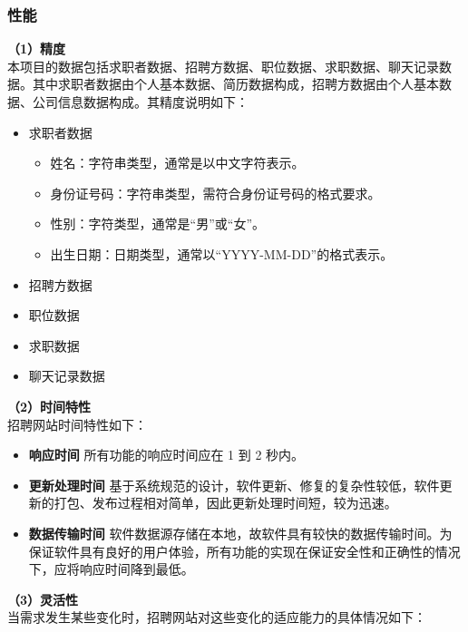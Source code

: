 \documentclass[UTF8,a4paper,10pt]{ctexart}
\begin{document}
\subsubsection{性能}

\textbf{（1）精度}\\
本项目的数据包括求职者数据、招聘方数据、职位数据、求职数据、聊天记录数据。其中求职者数据由个人基本数据、简历数据构成，招聘方数据由个人基本数据、公司信息数据构成。其精度说明如下：

\begin{itemize}
    \item 求职者数据
        \begin{itemize}
            \item 姓名：字符串类型，通常是以中文字符表示。
            \item 身份证号码：字符串类型，需符合身份证号码的格式要求。
            \item 性别：字符类型，通常是“男”或“女”。
            \item 出生日期：日期类型，通常以“YYYY-MM-DD”的格式表示。
        \end{itemize}
    \item 招聘方数据
    \item 职位数据
    \item 求职数据
    \item 聊天记录数据
\end{itemize}

\textbf{（2）时间特性}\\
招聘网站时间特性如下：

\begin{itemize}
    \item \textbf{响应时间} \space 所有功能的响应时间应在 1 到 2 秒内。
    \item \textbf{更新处理时间} \space 基于系统规范的设计，软件更新、修复的复杂性较低，软件更新的打包、发布过程相对简单，因此更新处理时间短，较为迅速。
    \item \textbf{数据传输时间} \space 软件数据源存储在本地，故软件具有较快的数据传输时间。为保证软件具有良好的用户体验，所有功能的实现在保证安全性和正确性的情况下，应将响应时间降到最低。
\end{itemize}

\textbf{（3）灵活性}\\
当需求发生某些变化时，招聘网站对这些变化的适应能力的具体情况如下：
\end{document}
